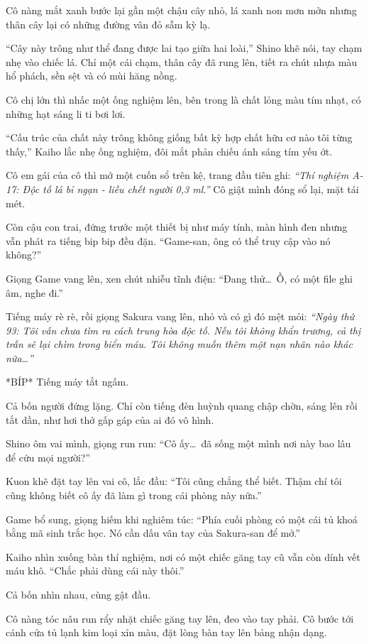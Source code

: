 \documentclass[../main.tex]{subfiles}
\begin{document}
Cô nàng mắt xanh bước lại gần một chậu cây nhỏ, lá xanh non mơn mởn nhưng thân cây lại có những đường vân đỏ sẫm kỳ lạ.

``Cây này trông như thể đang được lai tạo giữa hai loài,'' Shino khẽ nói, tay chạm nhẹ vào chiếc lá. Chỉ một cái chạm, thân cây đã rung lên, tiết ra chút nhựa màu hổ phách, sền sệt và có mùi hăng nồng.

Cô chị lớn thì nhấc một ống nghiệm lên, bên trong là chất lỏng màu tím nhạt, có những hạt sáng li ti bơi lơi.

``Cấu trúc của chất này trông không giống bất kỳ hợp chất hữu cơ nào tôi từng thấy,'' Kaiho lắc nhẹ ống nghiệm, đôi mắt phản chiếu ánh sáng tím yếu ớt.

Cô em gái của cô thì mở một cuốn sổ trên kệ, trang đầu tiên ghi: \textit{``Thí nghiệm A-17: Độc tố lá bỉ ngạn - liều chết người 0,3 ml.''} Cô giật mình đóng sổ lại, mặt tái mét.

Còn cậu con trai, đứng trước một thiết bị như máy tính, màn hình đen nhưng vẫn phát ra tiếng bip bip đều đặn. ``Game-san, ông có thể truy cập vào nó không?''

Giọng Game vang lên, xen chút nhiễu tĩnh điện: ``Đang thử\dots\ Ồ, có một file ghi âm, nghe đi.''

Tiếng máy rè rè, rồi giọng Sakura vang lên, nhỏ và có gì đó mệt mỏi: \textit{``Ngày thứ 93: Tôi vẫn chưa tìm ra cách trung hòa độc tố. Nếu tôi không khẩn trương, cả thị trấn sẽ lại chìm trong biển máu. Tôi không muốn thêm một nạn nhân nào khác nữa\dots''}

*BÍP* Tiếng máy tắt ngấm.

Cả bốn người đứng lặng. Chỉ còn tiếng đèn huỳnh quang chập chờn, sáng lên rồi tắt dần, như hơi thở gấp gáp của ai đó vô hình.

Shino ôm vai mình, giọng run run: ``Cô ấy\dots\ đã sống một mình nơi này bao lâu để cứu mọi người?''

Kuon khẽ đặt tay lên vai cô, lắc đầu: ``Tôi cũng chẳng thể biết. Thậm chí tôi cũng không biết cô ấy đã làm gì trong cái phòng này nữa.''

Game bổ sung, giọng hiếm khi nghiêm túc: ``Phía cuối phòng có một cái tủ khoá bằng mã sinh trắc học. Nó cần dấu vân tay của Sakura-san để mở.''

Kaiho nhìn xuống bàn thí nghiệm, nơi có một chiếc găng tay cũ vẫn còn dính vết máu khô. ``Chắc phải dùng cái này thôi.''

Cả bốn nhìn nhau, cùng gật đầu.

Cô nàng tóc nâu run rẩy nhặt chiếc găng tay lên, đeo vào tay phải. Cô bước tới cánh cửa tủ lạnh kim loại xỉn màu, đặt lòng bàn tay lên bảng nhận dạng.
\end{document}
